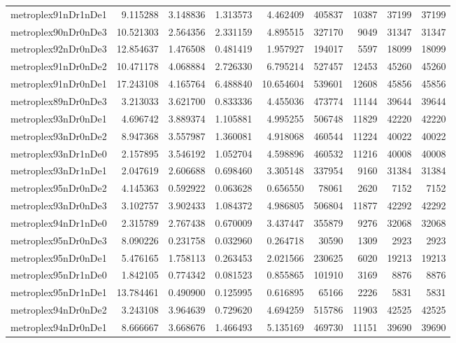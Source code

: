 \begin{longtable}{|l|r|r|r|r|r|r|r|r|}
metroplex91nDr1nDe1 & 9.115288 & 3.148836 & 1.313573 & 4.462409 & 405837 & 10387 & 37199 & 37199 \\
metroplex90nDr0nDe3 & 10.521303 & 2.564356 & 2.331159 & 4.895515 & 327170 & 9049 & 31347 & 31347 \\
metroplex92nDr0nDe3 & 12.854637 & 1.476508 & 0.481419 & 1.957927 & 194017 & 5597 & 18099 & 18099 \\
metroplex91nDr0nDe2 & 10.471178 & 4.068884 & 2.726330 & 6.795214 & 527457 & 12453 & 45260 & 45260 \\
metroplex91nDr0nDe1 & 17.243108 & 4.165764 & 6.488840 & 10.654604 & 539601 & 12608 & 45856 & 45856 \\
metroplex89nDr0nDe3 & 3.213033 & 3.621700 & 0.833336 & 4.455036 & 473774 & 11144 & 39644 & 39644 \\
metroplex93nDr0nDe1 & 4.696742 & 3.889374 & 1.105881 & 4.995255 & 506748 & 11829 & 42220 & 42220 \\
metroplex93nDr0nDe2 & 8.947368 & 3.557987 & 1.360081 & 4.918068 & 460544 & 11224 & 40022 & 40022 \\
metroplex93nDr1nDe0 & 2.157895 & 3.546192 & 1.052704 & 4.598896 & 460532 & 11216 & 40008 & 40008 \\
metroplex93nDr1nDe1 & 2.047619 & 2.606688 & 0.698460 & 3.305148 & 337954 & 9160 & 31384 & 31384 \\
metroplex95nDr0nDe2 & 4.145363 & 0.592922 & 0.063628 & 0.656550 & 78061 & 2620 & 7152 & 7152 \\
metroplex93nDr0nDe3 & 3.102757 & 3.902433 & 1.084372 & 4.986805 & 506804 & 11877 & 42292 & 42292 \\
metroplex94nDr1nDe0 & 2.315789 & 2.767438 & 0.670009 & 3.437447 & 355879 & 9276 & 32068 & 32068 \\
metroplex95nDr0nDe3 & 8.090226 & 0.231758 & 0.032960 & 0.264718 & 30590 & 1309 & 2923 & 2923 \\
metroplex95nDr0nDe1 & 5.476165 & 1.758113 & 0.263453 & 2.021566 & 230625 & 6020 & 19213 & 19213 \\
metroplex95nDr1nDe0 & 1.842105 & 0.774342 & 0.081523 & 0.855865 & 101910 & 3169 & 8876 & 8876 \\
metroplex95nDr1nDe1 & 13.784461 & 0.490900 & 0.125995 & 0.616895 & 65166 & 2226 & 5831 & 5831 \\
metroplex94nDr0nDe2 & 3.243108 & 3.964639 & 0.729620 & 4.694259 & 515786 & 11903 & 42525 & 42525 \\
metroplex94nDr0nDe1 & 8.666667 & 3.668676 & 1.466493 & 5.135169 & 469730 & 11151 & 39690 & 39690 \\

\end{longtable}
